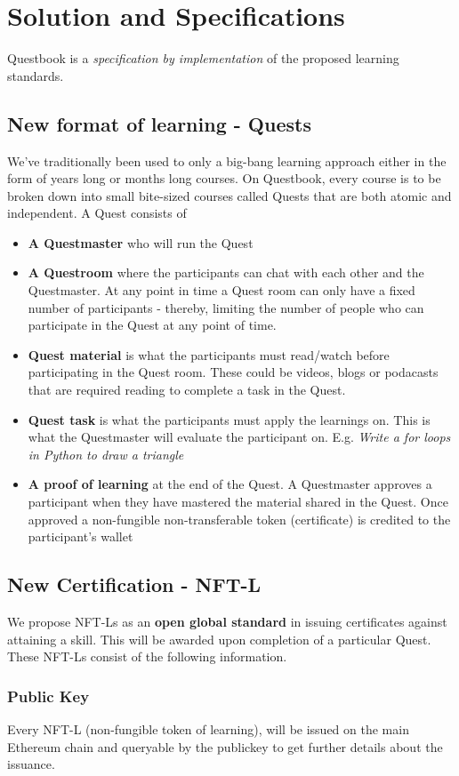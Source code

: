 \documentclass{article}
\begin{document}
  \section{Solution and Specifications}
    Questbook is a \textit{specification by implementation} of the proposed learning standards.
    \subsection{New format of learning - Quests}
      We've traditionally been used to only a big-bang learning approach either in the form of years long or months long courses.
      On Questbook, every course is to be broken down into small bite-sized courses called Quests that are both atomic and independent.
      A Quest consists of 
      \begin{itemize}
        \item \textbf{A Questmaster} who will run the Quest
        \item \textbf{A Questroom} where the participants can chat with each other and the Questmaster. At any point in time a Quest room can only have  a fixed number of participants - thereby, limiting the number of people who can participate in the Quest at any point of time.
        \item \textbf{Quest material} is what the participants must read/watch before participating in the Quest room. These could be videos, blogs or podacasts that are required reading to complete a task in the Quest.
        \item \textbf{Quest task} is what the participants must apply the learnings on. This is what the Questmaster will evaluate the participant on. E.g. \textit{Write a for loops in Python to draw a triangle}
        \item \textbf{A proof of learning} at the end of the Quest. A Questmaster approves a participant when they have mastered the material shared in the Quest. Once approved a non-fungible non-transferable token (certificate) is credited to the participant's wallet
      \end{itemize}
    \subsection{New Certification - NFT-L}
      We propose NFT-Ls as an \textbf{open global standard} in issuing certificates against attaining a skill. This will be awarded upon completion of a particular Quest. These NFT-Ls consist of the following information.
      \subsubsection{Public Key}
        Every NFT-L (non-fungible token of learning), will be issued on the main Ethereum chain and queryable by the publickey to get further details about the issuance.
\end{document}
